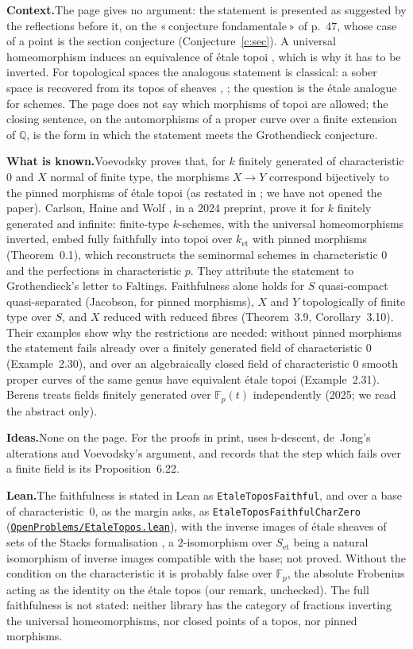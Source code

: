 \documentclass[11pt]{article}
\newcommand{\q}[1]{«\,#1\,»}
\theoremstyle{definition}
\theoremstyle{plain}\newtheorem*{proposition}{Proposition}\theoremstyle{definition}
\newcommand{\entry}[1]{\par\medskip\noindent\textbf{#1}\enspace}
\newcommand{\ctx}{\entry{Context.}}
\newcommand{\known}{\entry{What is known.}}
\newcommand{\ideas}{\entry{Ideas.}}
\newcommand{\leanst}{\entry{Lean.}}
\newcommand{\leanop}[1]{\href{https://github.com/Commutator-IO/GrothendieckArchivesProofs/blob/main/OpenProblems/#1.lean}{\nolinkurl{OpenProblems/#1.lean}}}
\begin{document}
\ctx The page gives no argument: the statement is presented as suggested by the reflections before it, on the \q{conjecture fondamentale} of p.~47, whose case of a point is the section conjecture (Conjecture~\ref{c:sec}). A universal homeomorphism induces an equivalence of étale topoi \cite[Tag 04DZ]{stacks}, which is why it has to be inverted. For topological spaces the analogous statement is classical: a sober space is recovered from its topos of sheaves \cite[\S1.1.2 and Remark~1.1.28]{caramello2018}, \cite[Part~C1]{elephant}; the question is the étale analogue for schemes. The page does not say which morphisms of topoi are allowed; the closing sentence, on the automorphisms of a proper curve over a finite extension of $\mathbb Q$, is the form in which the statement meets the Grothendieck conjecture.

\known Voevodsky \cite{voevodsky1990} proves that, for $k$ finitely generated of characteristic $0$ and $X$ normal of finite type, the morphisms $X \to Y$ correspond bijectively to the pinned morphisms of étale topoi (as restated in \cite{chw}; we have not opened the paper). Carlson, Haine and Wolf \cite{chw}, in a 2024 preprint, prove it for $k$ finitely generated and infinite: finite-type $k$-schemes, with the universal homeomorphisms inverted, embed fully faithfully into topoi over $k_{\mathrm{et}}$ with pinned morphisms (Theorem~0.1), which reconstructs the seminormal schemes in characteristic $0$ and the perfections in characteristic $p$. They attribute the statement to Grothendieck's letter to Faltings. Faithfulness alone holds for $S$ quasi-compact quasi-separated (Jacobson, for pinned morphisms), $X$ and $Y$ topologically of finite type over $S$, and $X$ reduced with reduced fibres (Theorem~3.9, Corollary~3.10). Their examples show why the restrictions are needed: without pinned morphisms the statement fails already over a finitely generated field of characteristic $0$ (Example~2.30), and over an algebraically closed field of characteristic $0$ smooth proper curves of the same genus have equivalent étale topoi (Example~2.31). Berens \cite{berens} treats fields finitely generated over $\mathbb F_p(t)$ independently (2025; we read the abstract only).

\ideas None on the page. For the proofs in print, \cite{chw} uses h-descent, de~Jong's alterations and Voevodsky's argument, and records that the step which fails over a finite field is its Proposition~6.22.

\leanst The faithfulness is stated in Lean as \texttt{EtaleToposFaithful}, and over a base of characteristic~$0$, as the margin asks, as \texttt{EtaleToposFaithfulCharZero} (\leanop{EtaleTopos}), with the inverse images of étale sheaves of sets of the Stacks formalisation \cite{axiomstacks}, a $2$-isomorphism over $S_{\mathrm{et}}$ being a natural isomorphism of inverse images compatible with the base; not proved. Without the condition on the characteristic it is probably false over $\mathbb F_p$, the absolute Frobenius acting as the identity on the étale topos (our remark, unchecked). The full faithfulness is not stated: neither library has the category of fractions inverting the universal homeomorphisms, nor closed points of a topos, nor pinned morphisms.
\end{document}
